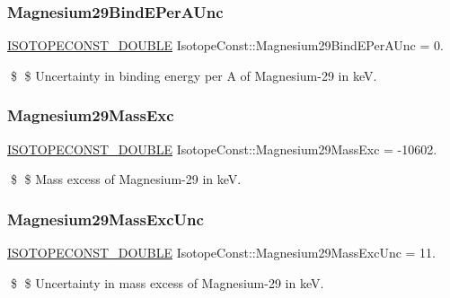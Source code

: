 \subsubsection{\texorpdfstring{Magnesium29\+Bind\+E\+Per\+A\+Unc}{Magnesium29BindEPerAUnc}}
{\footnotesize\ttfamily \mbox{\hyperlink{group___isotope_const-_macros_ga8f45a7272ce02c0b4c65c44636ed719a}{I\+S\+O\+T\+O\+P\+E\+C\+O\+N\+S\+T\+\_\+\+D\+O\+U\+B\+LE}} Isotope\+Const\+::\+Magnesium29\+Bind\+E\+Per\+A\+Unc = 0.}

\$ \$ Uncertainty in binding energy per A of Magnesium-\/29 in keV. \mbox{\label{group___isotope_const-_magnesium-_mg29_gaee7e71cfcddcaea6dee95f86add3f9f3}} 
\subsubsection{\texorpdfstring{Magnesium29\+Mass\+Exc}{Magnesium29MassExc}}
{\footnotesize\ttfamily \mbox{\hyperlink{group___isotope_const-_macros_ga8f45a7272ce02c0b4c65c44636ed719a}{I\+S\+O\+T\+O\+P\+E\+C\+O\+N\+S\+T\+\_\+\+D\+O\+U\+B\+LE}} Isotope\+Const\+::\+Magnesium29\+Mass\+Exc = -\/10602.}

\$ \$ Mass excess of Magnesium-\/29 in keV. \mbox{\label{group___isotope_const-_magnesium-_mg29_ga6babb55dde5781800ac204c102d602b4}} 
\subsubsection{\texorpdfstring{Magnesium29\+Mass\+Exc\+Unc}{Magnesium29MassExcUnc}}
{\footnotesize\ttfamily \mbox{\hyperlink{group___isotope_const-_macros_ga8f45a7272ce02c0b4c65c44636ed719a}{I\+S\+O\+T\+O\+P\+E\+C\+O\+N\+S\+T\+\_\+\+D\+O\+U\+B\+LE}} Isotope\+Const\+::\+Magnesium29\+Mass\+Exc\+Unc = 11.}

\$ \$ Uncertainty in mass excess of Magnesium-\/29 in keV. \mbox{\label{group___isotope_const-_magnesium-_mg29_gaec6b3b29f1dfc8eb828d83924699e3ef}} 

